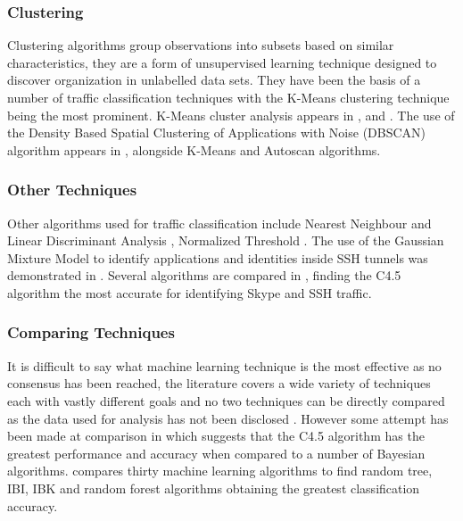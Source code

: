 \documentclass{ecuthesis}
\begin{document}
\subsubsection{Clustering}

Clustering algorithms group observations into subsets based on similar
characteristics, they are a form of unsupervised learning technique designed to
discover organization in unlabelled data sets. They have been the basis of a
number of traffic classification techniques with the K-Means clustering
technique being the most prominent.  K-Means cluster analysis appears in
\textcite{Bernaille:2006p2366}, \textcite{Erman:2007p3764} and
\textcite{Erman:2007p6206}. The use of the Density Based Spatial Clustering of
Applications with Noise (DBSCAN) algorithm appears in
\textcite{Erman:2006p3766}, alongside K-Means and Autoscan algorithms.

\subsubsection{Other Techniques}

Other algorithms used for traffic classification include Nearest Neighbour and
Linear Discriminant Analysis \parencite{Roughan:2004p3823}, Normalized
Threshold \parencite{Crotti:2007p3824}. The use of the Gaussian Mixture Model
to identify applications and identities inside SSH tunnels was demonstrated in
\textcite{Dusi:2008p6254}. Several algorithms are compared in
\textcite{Alshammari:2009p7474}, finding the C4.5 algorithm the most accurate
for identifying Skype and SSH traffic.

\subsubsection{Comparing Techniques}

It is difficult to say what machine learning technique is the most effective as
no consensus has been reached, the literature covers a wide variety of
techniques each with vastly different goals and no two techniques can be
directly compared as the data used for analysis has not been disclosed
\parencite{Kim:2007p3867}. However some attempt has been made at comparison in
\textcite{Williams:2006p3849} which suggests that the C4.5 algorithm has the
greatest performance and accuracy when compared to a number of Bayesian
algorithms. \textcite{Mohd:2009p6484} compares thirty machine learning
algorithms  to find random tree, IBI, IBK and random forest algorithms
obtaining the greatest classification accuracy.
\end{document}
